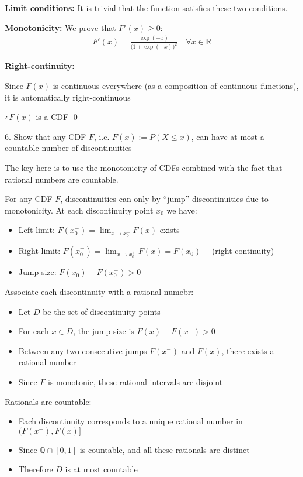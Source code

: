 \documentclass[10pt]{article}
\begin{document}
\textbf{Limit conditions:} It is trivial that the function satisfies these two conditions.

\textbf{Monotonicity:} We prove that $F'(x) \geq 0$:
\begin{align*}
    F'(x) = \frac{\exp(-x)}{\big(1 + \exp(-x)\big)^2} \quad\forall x \in \mathbb{R}
\end{align*}

\textbf{Right-continuity:} 

Since $F(x)$ is continuous everywhere (as a composition of continuous functions), it is automatically right-continuous

$\therefore F(x)$ is a CDF \qed 

\newpage

6. Show that any CDF $F$, i.e. $F(x) := P(X \leq x)$, can have at most a countable number of discontinuities

The key here is to use the monotonicity of CDFs combined with the fact that rational numbers are countable.

For any CDF $F$, discontinuities can only by ``jump'' discontinuities due to monotonicity. 
At each discontinuity point $x_0$ we have:

\begin{itemize}
    \item Left limit: $F(x_0^-) = \lim_{x \to x_0^-}F(x)$ exists
    \item Right limit: $F(x_0^+) = \lim_{x \to x_0^+} F(x) = F(x_0)\quad$ (right-continuity)
    \item Jump size: $F(x_0) - F(x_0^-) > 0$
\end{itemize}

\hfill

Associate each discontinuity with a rational numebr: 
\begin{itemize}
    \item Let $D$ be the set of discontinuity points
    \item For each $x \in D$, the jump size is $F(x) - F(x^-) > 0$
    \item Between any two consecutive jumps $F(x^-)$ and $F(x)$, there exists a rational number
    \item Since $F$ is monotonic, these rational intervals are disjoint
\end{itemize}

\hfill 

Rationals are countable: 
\begin{itemize}
    \item Each discontinuity corresponds to a unique rational number in $(F(x^-), F(x)]$
    \item Since $\mathbb{Q} \cap [0, 1]$ is countable, and all these rationals are distinct
    \item Therefore $D$ is at most countable
\end{itemize}
\end{document}

